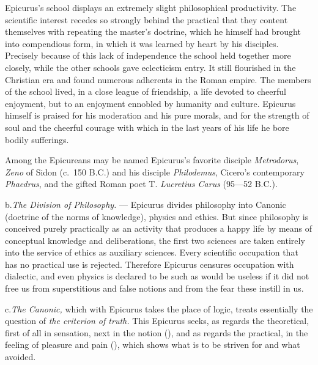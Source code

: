 Epicurus's school displays an extremely slight philosophical
productivity. The scientific interest recedes so strongly behind the
practical that they content themselves with repeating the master's
doctrine, which he himself had brought into compendious form, in which
it was learned by heart by his disciples. Precisely because of this
lack of independence the school held together more closely, while the
other schools gave eclecticism entry. It still flourished in the
Christian era and found numerous adherents in the Roman empire. The
members of the school lived, in a close league of friendship, a life
devoted to cheerful enjoyment, but to an enjoyment ennobled by humanity
and culture. Epicurus himself is praised for his moderation and his
pure morals, and for the strength of soul and the cheerful courage with
which in the last years of his life he bore bodily sufferings.

Among the Epicureans may be named Epicurus's favorite disciple
\emph{Metrodorus}, \emph{Zeno} of Sidon (c.\ 150 B.C.) and his disciple
\emph{Philodemus}, Cicero's contemporary \emph{Phaedrus}, and the
gifted Roman poet T. \emph{Lucretius Carus} (95---52 B.C.).

\divrule

b.\enspace \emph{The Division of Philosophy.} --- Epicurus divides
philosophy into Canonic (doctrine of the norms of knowledge), physics
and ethics. But since philosophy is conceived purely practically as an
activity that produces a happy life by means of conceptual knowledge and
deliberations, the first two sciences are taken entirely into the
service of ethics as auxiliary
sciences. Every scientific occupation that has no practical
use is rejected. Therefore Epicurus censures occupation with
dialectic, and even physics is declared to be such as would be useless
if it did not free us from superstitious and false notions and from the
fear these instill in us.

\divrule

c.\enspace \emph{The Canonic,} which with Epicurus takes the place of
logic, treats essentially the question of \emph{the criterion of
truth.} This Epicurus seeks, as regards the theoretical, first of all
in sensation, next in the notion (), and as regards the
practical, in the feeling of pleasure and pain (), which shows
what is to be striven for and what avoided.


